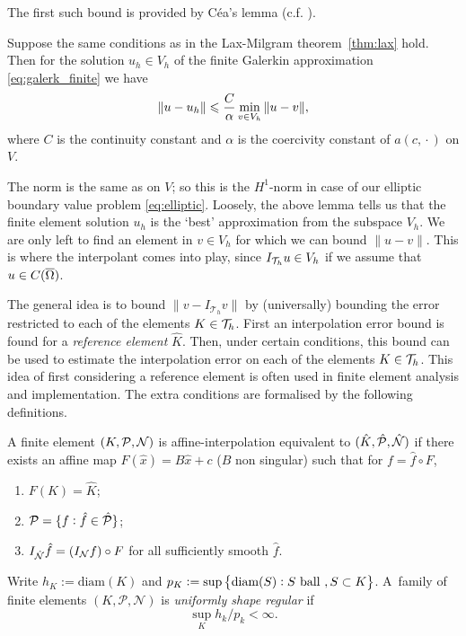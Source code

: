 \documentclass[thesis.tex]{subfiles}
\begin{document}
  The first such bound is provided by C\'ea's lemma (c.f. \cite[Thm~2.8.1]{brenner}).
  \begin{lem}
    Suppose the same conditions as in the Lax-Milgram theorem~\ref{thm:lax} hold. Then for the solution $u_h \in V_h$ of the
    finite Galerkin approximation \eqref{eq:galerk_finite} we have
    \[
      \| u - u_h\| \leq {C \over \alpha} \min_{v \in V_h} \| u - v\|,
    \]
    where $C$ is the continuity constant and $\alpha$ is the coercivity constant of $a(c\dot, \cdot)$ on $V$.
  \end{lem}
  The norm is the same as on $V$; so this is the $H^1$-norm in case of our elliptic boundary value problem \eqref{eq:elliptic}.
  Loosely, the above lemma tells us that the finite element solution $u_h$ is the `best' approximation from the subspace $V_h$. We are
  only left to find an element in $v \in V_h$ for which we can bound $\|u - v\|$. This is where the interpolant comes into play, since $I_{\T_h}u \in V_h$ if we assume that $u \in C(\OO)$.

  The general idea is to bound $\|v - I_{\mathcal{T}_h} v\|$ by (universally) bounding the error restricted to each of the elements $K\in\T_h$.  
  First an interpolation error bound is found for a \emph{reference element} $\hat K$. Then, under certain conditions, this bound can be used to estimate the interpolation error on each of the elements $K \in \T_h$. This idea of first considering a reference element is often 
  used in finite element analysis and implementation. The extra conditions are formalised by the following definitions.
  \begin{defn}
    A finite element $(K, \P, \N)$ is affine-interpolation equivalent to $(\hat K, \hat \P, \hat \N)$ if there
    exists an affine map $ F(\hat x) = B\hat x + c$ ($B$ non singular) such that for $f = \hat f \circ F$,
    \begin{enumerate}[label=(\roman*)]
      \item $F(K) = \hat K$;
      \item $\P = \{f : \hat f \in \hat \P\}$;
    \item $I_{\hat \N} \hat f = \left( I_{\N} f \right)\circ F$ for all sufficiently smooth $\hat f$.
    \end{enumerate}
  \end{defn}
  \begin{defn}
    Write $h_K := \text{diam}(K)$ and $p_K := \sup\set{\text{diam}(S): S \text{ ball }, S \subset K}$.
    A~family of finite elements $(K, \mathcal{P}, \mathcal{N})$ is \emph{uniformly shape regular} if 
    \[
      \sup_K h_k/p_k < \infty.
    \]
  \end{defn}
\end{document}
